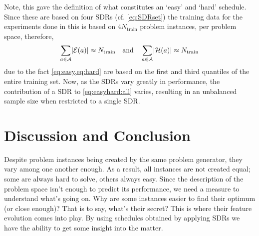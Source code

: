 Note, this  gave the definition of what 
constitutes an `easy' and `hard' schedule. Since these are based on four SDRs 
(cf. \cref{eq:SDRset}) the training data for the experiments done in this 
 is based on $4N_{\text{train}}$ problem 
instances, per problem space, therefore,
\begin{equation}\label{eq:easyhard:all}
  \sum_{a\in\mathcal{A}}\abs{\mathcal{E}(a)} \approx N_{\text{train}}
  \quad\text{and}\quad
  \sum_{a\in\mathcal{A}}\abs{\mathcal{H}(a)} \approx N_{\text{train}}
\end{equation} 
due to the fact \cref{eq:easy,eq:hard} are based on the first and third quantiles of the entire training set.
Now, as the SDRs vary greatly in performance, the contribution of a SDR to \cref{eq:easyhard:all} varies, resulting in an unbalanced sample size when restricted to a single SDR. 



\section{Discussion and Conclusion}
Despite problem instances being created by the same problem generator, they vary among one another enough. As a result, all instances are not created equal; some are always hard to solve, others always easy. 
Since the description of the problem space isn't enough to predict its performance, we need a measure to understand what's going on. Why are some instances easier to find their optimum (or close enough)? That is to say, what's their secret? This is where their feature evolution comes into play.
By using schedules obtained by applying SDRs we have the ability to get some insight into the matter. 

